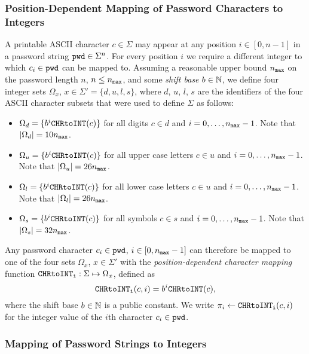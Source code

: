 \subsubsection{Position-Dependent Mapping of Password Characters to Integers}
A printable \ac{ASCII}  character $c\in\Sigma$ may appear at any position $i\in[0, n-1]$ in a password string $\mathtt{pwd}\in\Sigma^n$. For every position $i$ we require a different integer to which $c_i\in\mathtt{pwd}$ can be mapped to.
Assuming a reasonable upper bound ${n_\mathtt{max}}$ on the password length $n$, \ie $n\leq {n_\mathtt{max}}$, and some \emph{shift base} $b\in\mathbb{N}$, we define four integer sets $\Omega_x$, $x\in\Sigma' = \{d, u, l, s\}$, where $d$, $u$, $l$, $s$ are the identifiers of the four \ac{ASCII}  character subsets that were used to define $\Sigma$ as follows:
\begin{itemize}
	\item $\Omega_d = \{b^i\texttt{CHRtoINT}(c)\}$ for all digits $c\in d$ and $i=0,\ldots,{n_\mathtt{max}}-1$. Note that $|\Omega_d|= 10{n_\mathtt{max}}$.
	\item $\Omega_u = \{b^i\texttt{CHRtoINT}(c)\}$ for all upper case letters $c\in u$ and $i=0,\ldots,{n_\mathtt{max}}-1$. Note that $|\Omega_u|= 26{n_\mathtt{max}}$.
	\item $\Omega_l = \{b^i\texttt{CHRtoINT}(c)\}$ for all lower case letters $c\in u$ and $i=0,\ldots,{n_\mathtt{max}}-1$. Note that $|\Omega_l|= 26{n_\mathtt{max}}$.
	\item $\Omega_s = \{b^i\texttt{CHRtoINT}(c)\}$ for all symbols $c\in s$ and $i=0,\ldots,{n_\mathtt{max}}-1$. Note that $|\Omega_s|= 32{n_\mathtt{max}}$.
\end{itemize}
Any password character $c_i\in\mathtt{pwd}$, $i\in[0,{n_\mathtt{max}}-1]$ can therefore be mapped to one of the four sets $\Omega_x$, $x\in\Sigma'$ with the \emph{position-dependent character mapping} function $\texttt{CHRtoINT}_\texttt{i}:\Sigma\mapsto\Omega_{x}$, defined as
\[
\texttt{CHRtoINT}_\texttt{i}(c, i)= b^i\texttt{CHRtoINT}(c),
\]
where the shift base $b\in\mathbb{N}$ is a public constant.
We write $\pi_i \gets \texttt{CHRtoINT}_\texttt{i}(c, i)$ for the integer value of the $i$th character $c_i\in\mathtt{pwd}$.

\subsubsection{Mapping of Password Strings to Integers}


